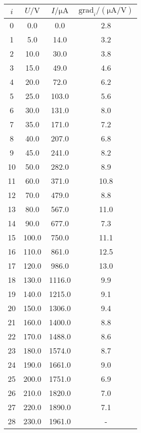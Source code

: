 \begin{table}
    \centering
    \begin{tabular}{S[table-format=:.0] S S S}
        \toprule
        {$i$} &
        {$U / \unit{\volt}$} &
        {$I/ \unit{\micro\ampere}$} &
        {$\text{grad}_i/ (\unit{\micro\ampere\per\volt})$} \\
            & 0.0      & 0.0       & 2.8   \\
        1    & 5.0      & 14.0      & 3.2   \\
        2    & 10.0     & 30.0      & 3.8   \\
        3    & 15.0     & 49.0      & 4.6   \\
        4    & 20.0     & 72.0      & 6.2   \\
        5    & 25.0     & 103.0     & 5.6   \\
        6    & 30.0     & 131.0     & 8.0   \\
        7    & 35.0     & 171.0     & 7.2   \\
        8    & 40.0     & 207.0     & 6.8   \\
        9    & 45.0     & 241.0     & 8.2   \\
        10   & 50.0     & 282.0     & 8.9   \\
        11   & 60.0     & 371.0     & 10.8  \\
        12   & 70.0     & 479.0     & 8.8   \\
        13   & 80.0     & 567.0     & 11.0  \\
        14   & 90.0     & 677.0     & 7.3   \\
        15   & 100.0    & 750.0     & 11.1  \\
        16   & 110.0    & 861.0     & 12.5  \\
        17   & 120.0    & 986.0     & 13.0  \\
        18   & 130.0    & 1116.0    & 9.9   \\
        19   & 140.0    & 1215.0    & 9.1   \\
        20   & 150.0    & 1306.0    & 9.4   \\
        21   & 160.0    & 1400.0    & 8.8   \\
        22   & 170.0    & 1488.0    & 8.6   \\
        23   & 180.0    & 1574.0    & 8.7   \\
        24   & 190.0    & 1661.0    & 9.0   \\
        25   & 200.0    & 1751.0    & 6.9   \\
        26   & 210.0    & 1820.0    & 7.0   \\
        27   & 220.0    & 1890.0    & 7.1   \\
        28   & 230.0    & 1961.0    & {-}  \\
        \bottomrule
    \end{tabular}
    \caption{}
\end{table}